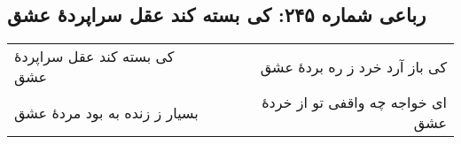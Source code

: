 \begin{center}
\section*{رباعی شماره ۲۴۵: کی بسته کند عقل سراپردهٔ عشق}
\label{sec:sh245}
\begin{longtable}{l p{0.5cm} r}
کی بسته کند عقل سراپردهٔ عشق
&&
کی باز آرد خرد ز ره بردهٔ عشق
\\
بسیار ز زنده به بود مردهٔ عشق
&&
ای خواجه چه واقفی تو از خردهٔ عشق
\\
\end{longtable}
\end{center}
